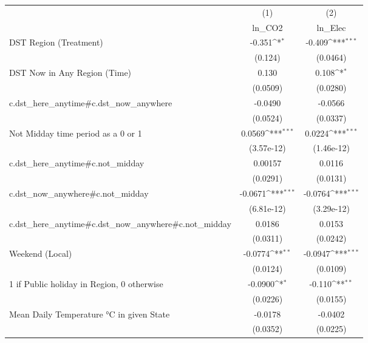 {
\def\sym#1{\ifmmode^{#1}\else\(^{#1}\)\fi}
\begin{tabular}{l*{2}{c}}
\hline\hline
                    &\multicolumn{1}{c}{(1)}&\multicolumn{1}{c}{(2)}\\
                    &\multicolumn{1}{c}{ln\_CO2}&\multicolumn{1}{c}{ln\_Elec}\\
\hline
DST Region (Treatment)&      -0.351\sym{*}  &      -0.409\sym{***}\\
                    &     (0.124)         &    (0.0464)         \\
[1em]
DST Now in Any Region (Time)&       0.130         &       0.108\sym{*}  \\
                    &    (0.0509)         &    (0.0280)         \\
[1em]
c.dst\_here\_anytime#c.dst\_now\_anywhere&     -0.0490         &     -0.0566         \\
                    &    (0.0524)         &    (0.0337)         \\
[1em]
Not Midday time period as a 0 or 1&      0.0569\sym{***}&      0.0224\sym{***}\\
                    &  (3.57e-12)         &  (1.46e-12)         \\
[1em]
c.dst\_here\_anytime#c.not\_midday&     0.00157         &      0.0116         \\
                    &    (0.0291)         &    (0.0131)         \\
[1em]
c.dst\_now\_anywhere#c.not\_midday&     -0.0671\sym{***}&     -0.0764\sym{***}\\
                    &  (6.81e-12)         &  (3.29e-12)         \\
[1em]
c.dst\_here\_anytime#c.dst\_now\_anywhere#c.not\_midday&      0.0186         &      0.0153         \\
                    &    (0.0311)         &    (0.0242)         \\
[1em]
Weekend (Local)     &     -0.0774\sym{**} &     -0.0947\sym{***}\\
                    &    (0.0124)         &    (0.0109)         \\
[1em]
1 if Public holiday in Region, 0 otherwise&     -0.0900\sym{*}  &      -0.110\sym{**} \\
                    &    (0.0226)         &    (0.0155)         \\
[1em]
Mean Daily Temperature °C in given State&     -0.0178         &     -0.0402         \\
                    &    (0.0352)         &    (0.0225)         \\

\end{tabular}}

